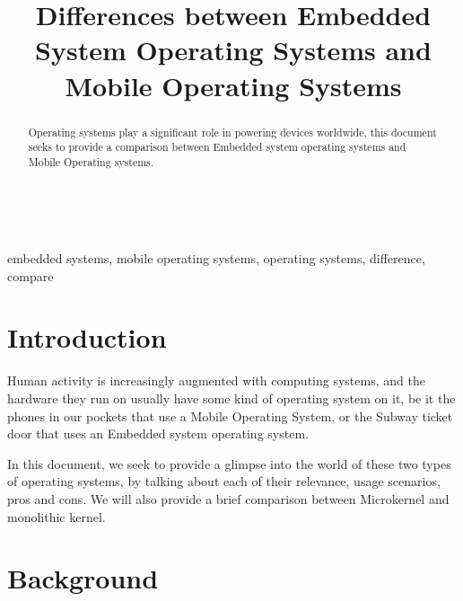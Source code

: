 \documentclass[conference]{IEEEtran}
\newcommand{\forceindent}{\leavevmode{\parindent=1em\indent}}
\begin{document}
\title{Differences between Embedded System Operating Systems and Mobile Operating Systems\\
}



\maketitle

\forceindent \begin{abstract}
Operating systems play a significant role in powering devices worldwide, this document seeks to provide a comparison between Embedded system operating systems and Mobile Operating systems.
\end{abstract}
\mbox{} \\
\forceindent \begin{IEEEkeywords}
embedded systems, mobile operating systems, operating systems, difference, compare
\end{IEEEkeywords}

\section{Introduction}
\forceindent Human activity is increasingly augmented with computing systems, and the hardware they run on usually have some kind of operating system on it, be it the phones in our pockets that use a Mobile Operating System, or the Subway ticket door that uses an Embedded system operating system.


\smallskip
\forceindent In this document, we seek to provide a glimpse into the world of these two types of operating systems, by talking about each of their relevance, usage scenarios, pros and cons. We will also provide a brief comparison between Microkernel and monolithic kernel.


\section{Background}
\end{document}
